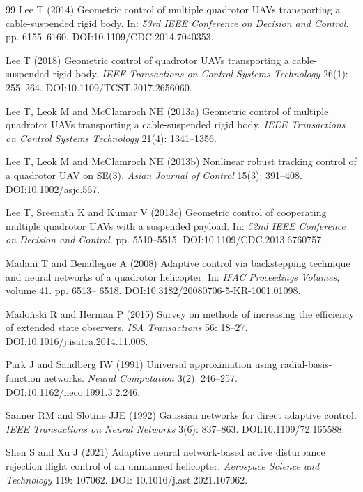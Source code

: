 \documentclass[Review,sageh,times]{sagej}
\begin{document}
\begin{thebibliography}{99}
Lee T (2014) Geometric control of multiple quadrotor UAVs transporting a cable-suspended
rigid body. In: \emph{53rd IEEE Conference on Decision and Control}. pp. 6155--6160.
DOI:10.1109/CDC.2014.7040353.

Lee T (2018) Geometric control of quadrotor UAVs transporting a cable-suspended rigid
body. \emph{IEEE Transactions on Control Systems Technology} 26(1): 255--264.
DOI:10.1109/TCST.2017.2656060.

Lee T, Leok M and McClamroch NH (2013a) Geometric control of multiple quadrotor UAVs
transporting a cable-suspended rigid body. \emph{IEEE Transactions on Control Systems Technology}
21(4): 1341--1356.

Lee T, Leok M and McClamroch NH (2013b) Nonlinear robust tracking control of a quadrotor
UAV on SE(3). \emph{Asian Journal of Control} 15(3): 391--408. DOI:10.1002/asjc.567.

Lee T, Sreenath K and Kumar V (2013c) Geometric control of cooperating multiple quadrotor
UAVs with a suspended payload. In: \emph{52nd IEEE Conference on Decision and Control}. pp.
5510--5515. DOI:10.1109/CDC.2013.6760757.

Madani T and Benallegue A (2008) Adaptive control via backstepping technique and neural
networks of a quadrotor helicopter. In: \emph{IFAC Proceedings Volumes}, volume 41. pp. 6513--
6518. DOI:10.3182/20080706-5-KR-1001.01098.

Mado\'nski R and Herman P (2015) Survey on methods of increasing the efficiency of extended state
observers. \emph{ISA Transactions} 56: 18--27. DOI:10.1016/j.isatra.2014.11.008.

Park J and Sandberg IW (1991) Universal approximation using radial-basis-function networks.
\emph{Neural Computation} 3(2): 246--257. DOI:10.1162/neco.1991.3.2.246.

Sanner RM and Slotine JJE (1992) Gaussian networks for direct adaptive control.
\emph{IEEE Transactions on Neural Networks} 3(6): 837--863. DOI:10.1109/72.165588.

Shen S and Xu J (2021) Adaptive neural network-based active disturbance rejection flight
control of an unmanned helicopter. \emph{Aerospace Science and Technology} 119: 107062. DOI:
10.1016/j.ast.2021.107062.


\end{thebibliography}
\end{document}
